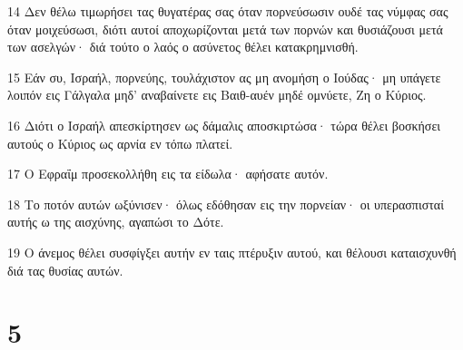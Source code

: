 \par 14 Δεν θέλω τιμωρήσει τας θυγατέρας σας όταν πορνεύσωσιν ουδέ τας νύμφας σας όταν μοιχεύσωσι, διότι αυτοί αποχωρίζονται μετά των πορνών και θυσιάζουσι μετά των ασελγών· διά τούτο ο λαός ο ασύνετος θέλει κατακρημνισθή.
\par 15 Εάν συ, Ισραήλ, πορνεύης, τουλάχιστον ας μη ανομήση ο Ιούδας· μη υπάγετε λοιπόν εις Γάλγαλα μηδ' αναβαίνετε εις Βαιθ-αυέν μηδέ ομνύετε, Ζη ο Κύριος.
\par 16 Διότι ο Ισραήλ απεσκίρτησεν ως δάμαλις αποσκιρτώσα· τώρα θέλει βοσκήσει αυτούς ο Κύριος ως αρνία εν τόπω πλατεί.
\par 17 Ο Εφραΐμ προσεκολλήθη εις τα είδωλα· αφήσατε αυτόν.
\par 18 Το ποτόν αυτών ωξύνισεν· όλως εδόθησαν εις την πορνείαν· οι υπερασπισταί αυτής ω της αισχύνης, αγαπώσι το Δότε.
\par 19 Ο άνεμος θέλει συσφίγξει αυτήν εν ταις πτέρυξιν αυτού, και θέλουσι καταισχυνθή διά τας θυσίας αυτών.

\chapter{5}

